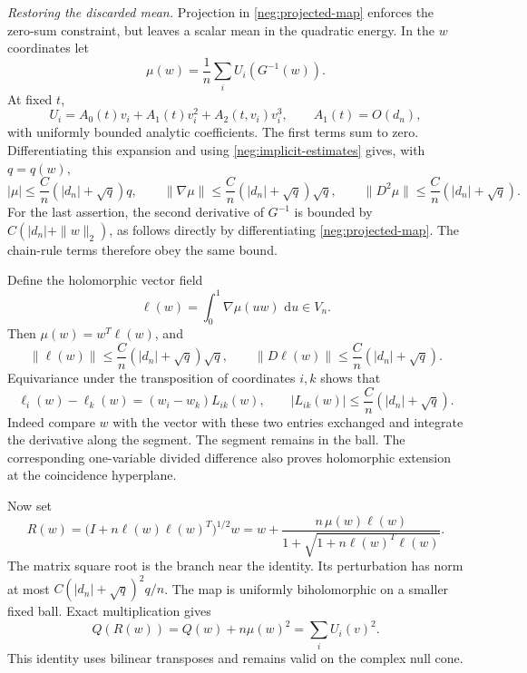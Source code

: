 \documentclass[11pt]{article}
\numberwithin{equation}{section}
\theoremstyle{definition}
\newcommand{\dd}{\,\mathrm d}
\begin{document}
\emph{Restoring the discarded mean.}
Projection in \eqref{neg:projected-map} enforces the zero-sum
constraint, but leaves a scalar mean in the quadratic energy.
In the \(w\) coordinates let
\[
 \mu(w)=\frac1n\sum_i U_i(G^{-1}(w)).
 \]
At fixed \(t\),
\[
 U_i=A_0(t)v_i+A_1(t)v_i^2+A_2(t,v_i)v_i^3,
 \qquad A_1(t)=O(d_n),
 \]
with uniformly bounded analytic coefficients.  The first terms
sum to zero.  Differentiating this expansion and using
\eqref{neg:implicit-estimates} gives, with \(q=q(w)\),
\begin{equation}
 |\mu|\le\frac Cn(|d_n|+\sqrt q)q,\qquad
 \|\nabla\mu\|\le\frac Cn(|d_n|+\sqrt q)\sqrt q,\qquad
 \|D^2\mu\|\le\frac Cn(|d_n|+\sqrt q).
 \label{neg:mean-estimates}
\end{equation}
For the last assertion, the second derivative of \(G^{-1}\)
is bounded by \(C(|d_n|+\|w\|_2)\), as follows directly by
differentiating \eqref{neg:projected-map}.  The chain-rule
terms therefore obey the same bound.

Define the holomorphic vector field
\begin{equation}
 \ell(w)=\int_0^1\nabla\mu(u w)\,\dd u\in V_n.
 \label{neg:ell}
\end{equation}
Then \(\mu(w)=w^T\ell(w)\), and
\[
 \|\ell(w)\|\le\frac Cn(|d_n|+\sqrt q)\sqrt q,\qquad
 \|D\ell(w)\|\le\frac Cn(|d_n|+\sqrt q).
 \]
Equivariance under the transposition of coordinates \(i,k\)
shows that
\begin{equation}
 \ell_i(w)-\ell_k(w)=(w_i-w_k)L_{ik}(w),\qquad
 |L_{ik}(w)|\le\frac Cn(|d_n|+\sqrt q).
 \label{neg:ell-pairs}
\end{equation}
Indeed compare \(w\) with the vector with these two entries
exchanged and integrate the derivative along the segment.
The segment remains in the ball.  The corresponding
one-variable divided difference also proves holomorphic
extension at the coincidence hyperplane.

Now set
\begin{equation}
 R(w)=\bigl(I+n\ell(w)\ell(w)^T\bigr)^{1/2}w
     =w+\frac{n\,\mu(w)\ell(w)}
                   {1+\sqrt{1+n\ell(w)^T\ell(w)}}.
 \label{neg:rank-one}
\end{equation}
The matrix square root is the branch near the identity.
Its perturbation has norm at most
\(C(|d_n|+\sqrt q)^2q/n\).  The map is uniformly
biholomorphic on a smaller fixed ball.  Exact multiplication
gives
\begin{equation}
 Q(R(w))=Q(w)+n\mu(w)^2=\sum_i U_i(v)^2 .
 \label{neg:rank-energy}
\end{equation}
This identity uses bilinear transposes and remains valid on
the complex null cone.
\end{document}
